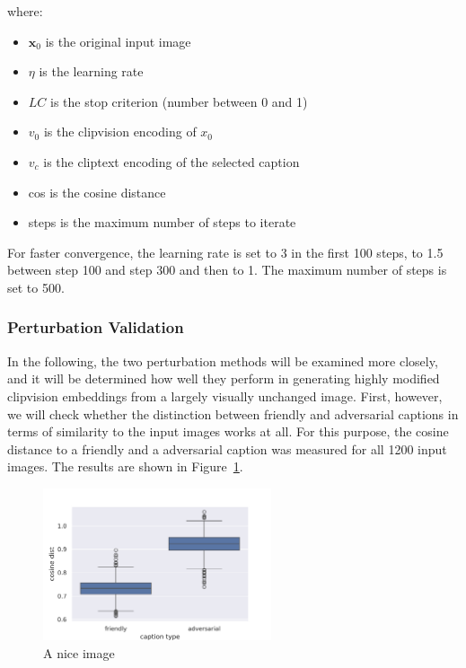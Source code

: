 where:
\begin{itemize}
    \item $\mathbf{x}_0$ is the original input image
    \item $\eta$ is the learning rate
    \item $LC$ is the stop criterion (number between 0 and 1)
    \item $v_0$ is the clipvision encoding of $x_0$
    \item $v_c$ is the cliptext encoding of the selected caption
    \item cos is the cosine distance
    \item steps is the maximum number of steps to iterate
\end{itemize}

For faster convergence, the learning rate is set to 3 in the first 100 steps, to 1.5 between step 100 and step 300 and then to 1. The maximum number of steps is set to 500.

\subsubsection{Perturbation Validation}

In the following, the two perturbation methods will be examined more closely, and it will be determined how well they perform in generating highly modified clipvision embeddings from a largely visually unchanged image. First, however, we will check whether the distinction between friendly and adversarial captions in terms of similarity to the input images works at all. For this purpose, the cosine distance to a friendly and a adversarial caption was measured for all 1200 input images. The results are shown in Figure~\ref{fig:advpert_sanity_check_friendly_vs_adversarial_cap}.

\begin{figure}[ht]
    \centering
    \includegraphics[width=0.6\textwidth]{plots/advpert_sanity_check_friendly_vs_adversarial_cap.png}
    \caption{A nice image}\label{fig:advpert_sanity_check_friendly_vs_adversarial_cap}
\end{figure}

